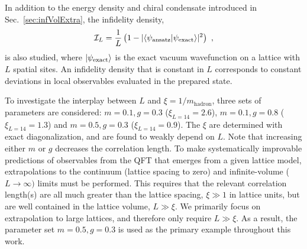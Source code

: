 \documentclass[aps, pra, onecolumn, tightenlines, letterpaper, amsmath, amssymb, preprintnumbers, floatfix, longbibliography, nofootinbib]{revtex4-2}
\newcommand{\infiL}{{\mathcal{I}_L}}
\begin{document}
%
\FloatBarrier
In addition to the energy density and chiral condensate introduced in Sec.~\ref{sec:infVolExtra}, the infidelity density,
%
\begin{equation}
\infiL = \frac{1}{L} \left( 1 - 
|\langle\psi_{\rm ansatz}|\psi_{\rm exact}\rangle|^2 \right)
\ ,
\label{eq:fiddens}
\end{equation} 
%
is also studied, where $|\psi_{\rm exact}\rangle$ is the exact vacuum wavefunction on a lattice with $L$ spatial sites.
An infidelity density that is constant in $L$ corresponds to constant deviations in local observables evaluated in the prepared state.

To investigate the interplay between $L$ and 
$\xi=1/m_{\text{hadron}}$, 
three sets of parameters are considered: 
$m=0.1, g=0.3$ ($\xi_{L=14} = 2.6$), 
$m=0.1, g=0.8$  ($\xi_{L=14} = 1.3$) 
and $m=0.5, g=0.3$  ($\xi_{L=14} = 0.9$).
The $\xi$ are determined with exact diagonalization, and are found to weakly depend on $L$.
Note that increasing either $m$ or $g$ decreases the correlation length.
To make systematically improvable predictions 
of observables from the QFT that emerges from a given lattice model, 
extrapolations to the continuum (lattice spacing to zero) and infinite-volume ($L \to \infty)$ limits must be performed.
This requires that the relevant correlation length(s) are all much greater than the lattice spacing, $\xi \gg 1$ in lattice units, but are well contained in the lattice volume, $L\gg\xi$.
We primarily focus on extrapolation to large lattices, and therefore only require $L\gg \xi$.
As a result, the parameter set $m=0.5, g=0.3$ is used as the primary example throughout this work.
\end{document}
